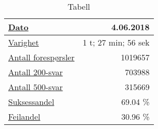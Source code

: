 \begin{table}[hbtp]
  \begin{center}
    \begin{tabular}{ | l | r |}
      \hline
      \underline{Dato} & 4.06.2018 \\ \hline
      \underline{Varighet} & 1 t; 27 min; 56 sek \\ \hline
      \underline{Antall forespørsler} & 1019657 \\ \hline
      \underline{Antall 200-svar} & 703988 \\ \hline
      \underline{Antall 500-svar} & 315669 \\ \hline
      \underline{Suksessandel} & 69.04 \% \\ \hline
      \underline{Feilandel} & 30.96 \% \\ \hline
    \end{tabular}
  \end{center}
  \caption{Tabell}
  \label{frontend3}
\end{table}
